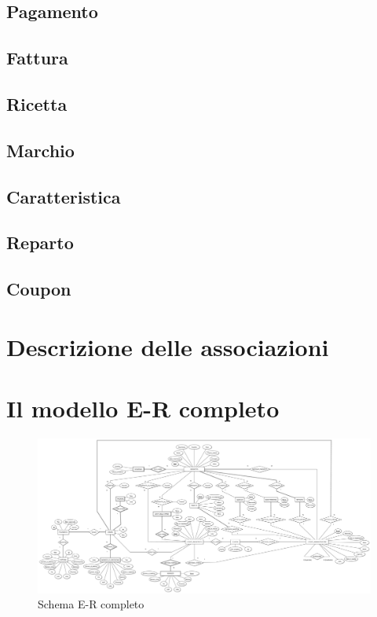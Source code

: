 	\subsection{Pagamento}
	
	\subsection{Fattura}
	
	\subsection{Ricetta}
	
	\subsection{Marchio}
	
	\subsection{Caratteristica}
	
	\subsection{Reparto}
		
	\subsection{Coupon}

\section{Descrizione delle associazioni}

\section{Il modello E-R completo}
\begin{figure}[h]
	\centering
	\includegraphics[width=1\textheight,
	angle=90]
	{immagini/diagramma-ER-completo}
	
	\caption{Schema E-R completo}
\end{figure}	